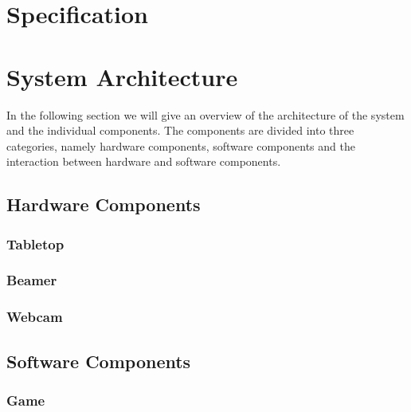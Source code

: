 \documentclass[a4paper,10pt]{report}
\begin{document}
\section{Specification}


\appendix
\section{System Architecture}	
In the following section we will give an overview of the architecture of the system and the individual components.
The components are divided into three categories, namely hardware components, software components and the interaction between hardware and software components.

	\subsection{Hardware Components}
		
		\subsubsection{Tabletop}
		
		\subsubsection{Beamer}
		
		\subsubsection{Webcam}


	\subsection{Software Components}

		\subsubsection{Game}
		
\end{document}
